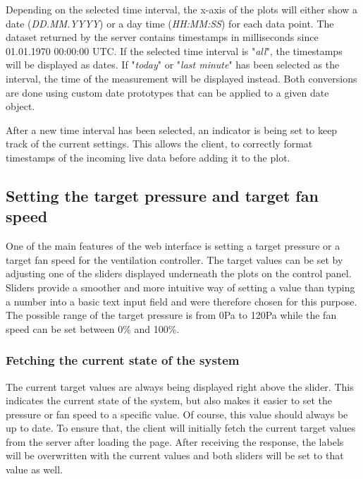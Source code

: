 Depending on the selected time interval, the x-axis of the plots will either show a date (\textit{DD.MM.YYYY}) or a day time (\textit{HH:MM:SS}) for each data point. The dataset returned by the server contains timestamps in milliseconds since 01.01.1970 00:00:00 UTC. If the selected time interval is "\textit{all}", the timestamps will be displayed as dates. If "\textit{today}" or "\textit{last minute}" has been selected as the interval, the time of the measurement will be displayed instead. Both conversions are done using custom date prototypes that can be applied to a given date object.

After a new time interval has been selected, an indicator is being set to keep track of the current settings. This allows the client, to correctly format timestamps of the incoming live data before adding it to the plot.



\subsection{Setting the target pressure and target fan speed}
\label{subsec:setting_the_target_pressure_and_target_fan_speed}

One of the main features of the web interface is setting a target pressure or a target fan speed for the ventilation controller. The target values can be set by adjusting one of the sliders displayed underneath the plots on the control panel. Sliders provide a smoother and more intuitive way of setting a value than typing a number into a basic text input field and were therefore chosen for this purpose. The possible range of the target pressure is from 0Pa to 120Pa while the fan speed can be set between 0\% and 100\%.


\subsubsection{Fetching the current state of the system}
\label{subsec:fetching_the_current_state_of_the_system}

The current target values are always being displayed right above the slider. This indicates the current state of the system, but also makes it easier to set the pressure or fan speed to a specific value. Of course, this value should always be up to date. To ensure that, the client will initially fetch the current target values from the server after loading the page. After receiving the response, the labels will be overwritten with the current values and both sliders will be set to that value as well.


